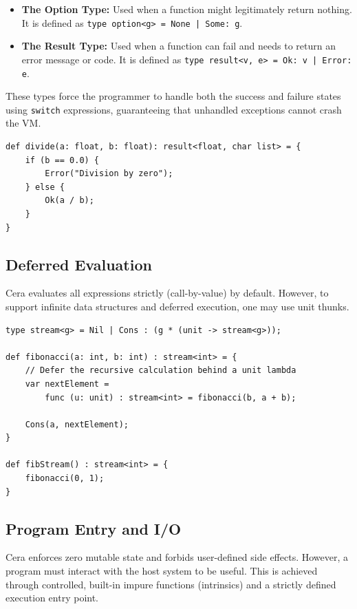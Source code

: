 \documentclass[11pt, a4paper]{article}
\begin{document}
\begin{itemize}
    \item \textbf{The Option Type:} Used when a function might legitimately return nothing. It is defined as \texttt{type option<g> = None | Some: g}.
    \item \textbf{The Result Type:} Used when a function can fail and needs to return an error message or code. It is defined as \texttt{type result<v, e> = Ok: v | Error: e}.
\end{itemize}

These types force the programmer to handle both the success and failure states using \texttt{switch} expressions, guaranteeing that unhandled exceptions cannot crash the VM.

\begin{lstlisting}[language=Cera, title={Error Handling via ADTs}, basicstyle=\ttfamily]
def divide(a: float, b: float): result<float, char list> = {
    if (b == 0.0) {
        Error("Division by zero");
    } else {
        Ok(a / b);
    }
}
\end{lstlisting}

\subsection{Deferred Evaluation}
\noindent
Cera evaluates all expressions strictly (call-by-value) by default. However, to support infinite data structures and deferred execution, one may use unit thunks.

\begin{lstlisting}[language=Cera, title={Infinite Fibonacci Stream}, basicstyle=\ttfamily]
type stream<g> = Nil | Cons : (g * (unit -> stream<g>));

def fibonacci(a: int, b: int) : stream<int> = {
    // Defer the recursive calculation behind a unit lambda
    var nextElement = 
        func (u: unit) : stream<int> = fibonacci(b, a + b);
    
    Cons(a, nextElement);
}

def fibStream() : stream<int> = {
    fibonacci(0, 1);
}
\end{lstlisting}

\subsection{Program Entry and I/O}
\noindent
Cera enforces zero mutable state and forbids user-defined side effects. However, a program must interact with the host system to be useful. This is achieved through controlled, built-in impure functions (intrinsics) and a strictly defined execution entry point.
\end{document}
